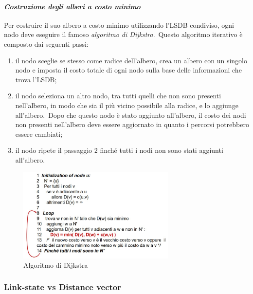 \paragraph{\emph{Costruzione degli alberi a costo minimo}}

Per costruire il suo albero a costo minimo utilizzando l'LSDB condiviso, ogni nodo deve eseguire il famoso \emph{algoritmo di Dijkstra}.\
Questo algoritmo iterativo è composto dai seguenti passi:

\begin{enumerate}
    \item il nodo sceglie se stesso come radice dell'albero, crea un albero con un singolo nodo e imposta il costo totale di ogni nodo sulla base delle informazioni che trova l'LSDB;
    \item il nodo seleziona un altro nodo, tra tutti quelli che non sono presenti nell'albero, in modo che sia il più vicino possibile alla radice, e lo aggiunge all'albero.\
          Dopo che questo nodo è stato aggiunto all'albero, il costo dei nodi non presenti nell'albero deve essere aggiornato in quanto i percorsi potrebbero essere cambiati;
    \item il nodo ripete il passaggio 2 finché tutti i nodi non sono stati aggiunti all'albero.
\end{enumerate}

\begin{figure}[H]
    \centering
    \includegraphics[width=0.7\textwidth]{immagini/Dijkstra.jpg}
    \caption*{Algoritmo di Dijkstra}
\end{figure}

\subsubsection{Link-state vs Distance vector}

